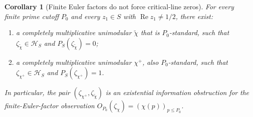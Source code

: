 \documentclass[12pt]{amsart}
\theoremstyle{definition}
\theoremstyle{remark}
\theoremstyle{plain}
\newtheorem{maincor}{Corollary}
\newcommand{\re}{\operatorname{Re}}
\begin{document}
\begin{maincor}[Finite Euler factors do not force critical-line zeros]
\label{cor:D}
For every finite prime cutoff $P_0$ and every $z_1 \in S$ with
$\re z_1 \neq 1/2$, there exist:
\begin{enumerate}[label=\textup{(\alph*)}]
  \item a completely multiplicative unimodular $\tilde\chi$ that is
    $P_0$-standard, such that $\zeta_{\tilde\chi} \in \mathcal{H}_S$
    and $P_S(\zeta_{\tilde\chi}) = 0$;
  \item a completely multiplicative unimodular $\chi^+$,
    also $P_0$-standard, such that $\zeta_{\chi^+} \in \mathcal{H}_S$
    and $P_S(\zeta_{\chi^+}) = 1$.
\end{enumerate}
In particular, the pair $(\zeta_{\chi^+}, \zeta_{\tilde\chi})$ is an
existential information obstruction for the finite-Euler-factor observation
$O_{P_0}(\zeta_\chi) = (\chi(p))_{p \leq P_0}$.
\end{maincor}
\end{document}
